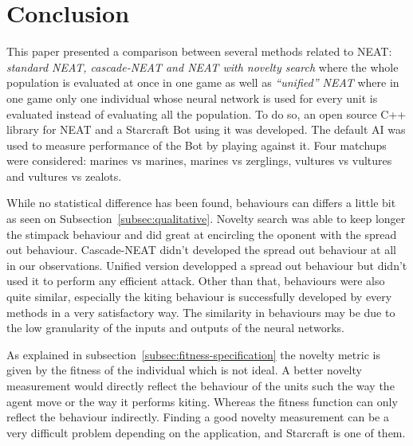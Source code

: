 \section{Conclusion}\label{section:conclusion}

This paper presented a comparison between several methods related to NEAT:
\emph{standard NEAT, cascade-NEAT and NEAT with novelty search} where the whole
population is evaluated at once in one game as well as \emph{``unified'' NEAT} where
in one game only one individual whose neural network is used for every unit is evaluated
instead of evaluating all the population.
To do so, an open source C++ library for NEAT and a Starcraft Bot using it was developed.
The default AI was used to measure performance of the Bot by playing against it.
Four matchups were considered: marines vs marines, marines vs zerglings, vultures vs vultures
and vultures vs zealots.

While no statistical difference has been found, behaviours can differs a little bit as seen
on Subsection~\ref{subsec:qualitative}. Novelty search was able to keep longer the
stimpack behaviour and did great at encircling the oponent with the spread out behaviour.
Cascade-NEAT didn't developed the spread out behaviour at all in our observations.
Unified version developped a spread out behaviour but didn't used it to perform any efficient attack.
Other than that, behaviours were also quite similar, especially the kiting behaviour is
successfully developed by every methods in a very satisfactory way. The similarity in behaviours may
be due to the low granularity of the inputs and outputs of the neural networks.

As explained in subsection~\ref{subsec:fitness-specification} the novelty metric is given by
the fitness of the individual which is not ideal. A better novelty measurement would directly reflect
the behaviour of the units such the way the agent move or the way it performs kiting. Whereas the fitness
function can only reflect the behaviour indirectly. Finding a good novelty measurement can be a
very difficult problem depending on the application, and Starcraft is one of them.

